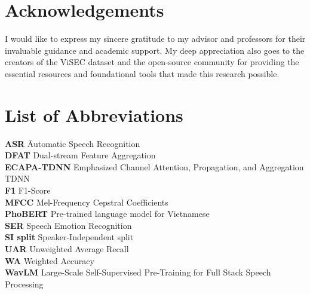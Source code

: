 \documentclass[12pt,a4paper]{report}
\begin{document}
\clearpage

\tableofcontents
\clearpage

\chapter*{Acknowledgements}
I would like to express my sincere gratitude to my advisor and professors for their invaluable guidance and academic support. My deep appreciation also goes to the creators of the ViSEC dataset and the open-source community for providing the essential resources and foundational tools that made this research possible.

\vspace{1.5cm}
\begingroup
\let\clearpage\relax
\chapter*{List of Abbreviations}
\begin{tabbing}
\textbf{ASR} \hspace{2cm} \= Automatic Speech Recognition \\
\textbf{DFAT} \> Dual-stream Feature Aggregation \\
\textbf{ECAPA-TDNN} \> Emphasized Channel Attention, Propagation, and Aggregation TDNN \\
\textbf{F1} \> F1-Score \\
\textbf{MFCC} \> Mel-Frequency Cepstral Coefficients \\
\textbf{PhoBERT} \> Pre-trained language model for Vietnamese \\
\textbf{SER} \> Speech Emotion Recognition \\
\textbf{SI split} \> Speaker-Independent split \\
\textbf{UAR} \> Unweighted Average Recall \\
\textbf{WA} \> Weighted Accuracy \\
\textbf{WavLM} \> Large-Scale Self-Supervised Pre-Training for Full Stack Speech Processing \\
\end{tabbing}
\endgroup

\clearpage

\listoftables
{}

\vspace{1.5cm}
\begingroup
\let\clearpage\relax
\listoffigures
{}
\endgroup
\end{document}
